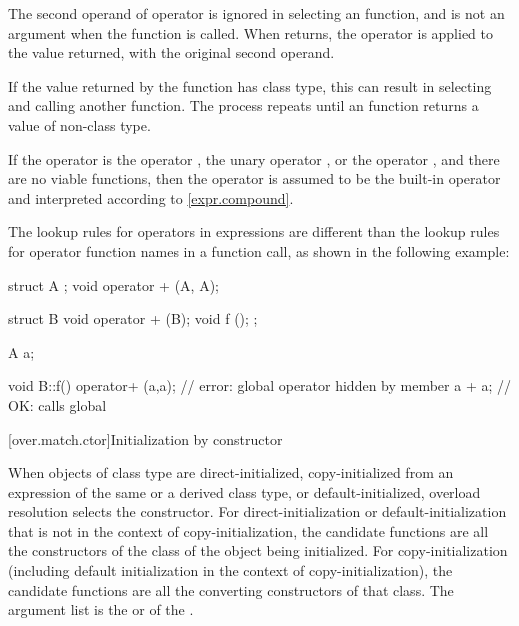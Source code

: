 \pnum
The second operand of operator
\tcode{->}
is ignored in selecting an
function, and is not an argument when the
function is called.
When
returns, the operator
\tcode{->}
is applied to the value returned, with the original second
operand.
\begin{footnote}
If the value returned by the
function has class type, this can result in selecting and calling another
function.
The process repeats until an
function returns a value of non-class type.
\end{footnote}

\pnum
If the operator is the operator
\tcode{,},
the unary operator
\tcode{\&},
or the operator
\tcode{->},
and there are no viable functions, then the operator is
assumed to be the built-in operator and interpreted according to
\ref{expr.compound}.

\pnum
\begin{note}
The lookup rules for operators in expressions are different than
the lookup
rules for operator function names in a function call, as shown in the following
example:

\begin{codeblock}
struct A { };
void operator + (A, A);

struct B {
  void operator + (B);
  void f ();
};

A a;

void B::f() {
  operator+ (a,a);              // error: global operator hidden by member
  a + a;                        // OK: calls global 
}
\end{codeblock}
\end{note}

[over.match.ctor]{Initialization by constructor}%

\pnum
When objects of class type are direct-initialized,
copy-initialized from an expression of the same or a
derived class type,
or default-initialized,
overload resolution selects the constructor.
For direct-initialization or default-initialization
that is not in the context of copy-initialization, the
candidate functions are
all the constructors of the class of the object being
initialized.
For copy-initialization (including default initialization
in the context of copy-initialization), the candidate functions are all
the converting constructors of that
class.
The argument list is the
 or 
of the .

